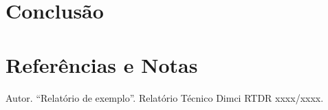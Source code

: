\documentclass[aps,showpacs,preprint,floatfix,hyphens,obeyspaces,spaces]{revtex4}
\begin{document}
 \section{Conclusão}
 \label{conclusao}
 
 
 \section{Refer\^encias e Notas}
 \label{referencias}
 
 \def\bibsection{}
 \begin{thebibliography}{99}

\bigbreak

  Autor. ``Relatório de exemplo''. Relatório Técnico Dimci RTDR xxxx/xxxx.
  
\end{thebibliography}  
\label{final}
\end{document}
